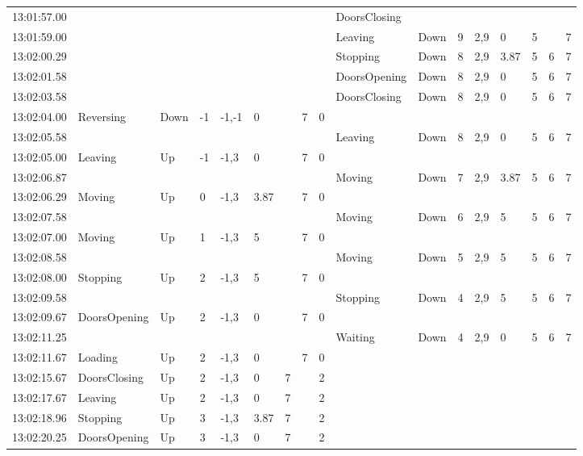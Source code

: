 \documentclass{UoYCSproject}
\begin{document}
\begin{appendices}
\begin{landscape}
\begin{longtable}{l || l | l | l | l | l | l | l | l || l | l | l | l | l | l | l | l}
	13:01:57.00 &  &  &  &  &  &  &  &  & DoorsClosing &  &  &  &  &  &  &  \\
	13:01:59.00 &  &  &  &  &  &  &  &  & Leaving & Down & 9 & 2,9 & 0 & 5 &  & 7 \\
	13:02:00.29 &  &  &  &  &  &  &  &  & Stopping & Down & 8 & 2,9 & 3.87 & 5 & 6 & 7 \\
	13:02:01.58 &  &  &  &  &  &  &  &  & DoorsOpening & Down & 8 & 2,9 & 0 & 5 & 6 & 7 \\
	13:02:03.58 &  &  &  &  &  &  &  &  & DoorsClosing & Down & 8 & 2,9 & 0 & 5 & 6 & 7 \\
	13:02:04.00 & Reversing & Down & -1 & -1,-1 & 0 &  & 7 & 0 &  &  &  &  &  &  &  &  \\
	13:02:05.58 &  &  &  &  &  &  &  &  & Leaving & Down & 8 & 2,9 & 0 & 5 & 6 & 7 \\
	13:02:05.00 & Leaving & Up & -1 & -1,3 & 0 &  & 7 & 0 &  &  &  &  &  &  &  &  \\
	13:02:06.87 &  &  &  &  &  &  &  &  & Moving & Down & 7 & 2,9 & 3.87 & 5 & 6 & 7 \\
	13:02:06.29 & Moving & Up & 0 & -1,3 & 3.87 &  & 7 & 0 &  &  &  &  &  &  &  &  \\
	13:02:07.58 &  &  &  &  &  &  &  &  & Moving & Down & 6 & 2,9 & 5 & 5 & 6 & 7 \\
	13:02:07.00 & Moving & Up & 1 & -1,3 & 5 &  & 7 & 0 &  &  &  &  &  &  &  &  \\
	13:02:08.58 &  &  &  &  &  &  &  &  & Moving & Down & 5 & 2,9 & 5 & 5 & 6 & 7 \\
	13:02:08.00 & Stopping & Up & 2 & -1,3 & 5 &  & 7 & 0 &  &  &  &  &  &  &  &  \\
	13:02:09.58 &  &  &  &  &  &  &  &  & Stopping & Down & 4 & 2,9 & 5 & 5 & 6 & 7 \\
	13:02:09.67 & DoorsOpening & Up & 2 & -1,3 & 0 &  & 7 & 0 &  &  &  &  &  &  &  &  \\
	13:02:11.25 &  &  &  &  &  &  &  &  & Waiting & Down & 4 & 2,9 & 0 & 5 & 6 & 7 \\
	13:02:11.67 & Loading & Up & 2 & -1,3 & 0 &  & 7 & 0 &  &  &  &  &  &  &  &  \\
	13:02:15.67 & DoorsClosing & Up & 2 & -1,3 & 0 & 7 &  & 2 &  &  &  &  &  &  &  &  \\
	13:02:17.67 & Leaving & Up & 2 & -1,3 & 0 & 7 &  & 2 &  &  &  &  &  &  &  &  \\
	13:02:18.96 & Stopping & Up & 3 & -1,3 & 3.87 & 7 &  & 2 &  &  &  &  &  &  &  &  \\
	13:02:20.25 & DoorsOpening & Up & 3 & -1,3 & 0 & 7 &  & 2 &  &  &  &  &  &  &  &  \\

\end{longtable}
\end{landscape}
\end{appendices}
\end{document}

